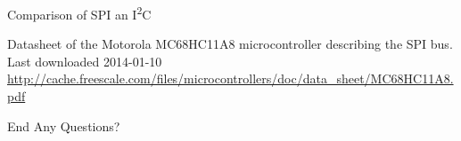 \documentclass[]{beamer} %
\newcommand{\twi}{I\textsuperscript{2}C\xspace}
\begin{document}
\begin{frame}[fragile]{Comparison of SPI an \twi}
\end{frame}







\tiny
\begin{thebibliography}{9}
		Datasheet of the Motorola MC68HC11A8 microcontroller describing the SPI bus.\\
		Last downloaded 2014-01-10\\
		\url{http://cache.freescale.com/files/microcontrollers/doc/data_sheet/MC68HC11A8.pdf}

\end{thebibliography}


\begin{frame}
	{\Huge End}
	Any Questions?
\end{frame}
\end{document}
